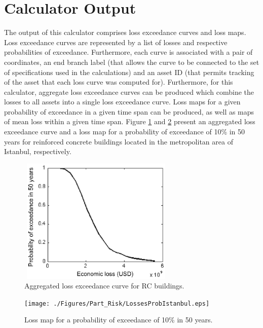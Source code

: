 \section{Calculator Output}
The output of this calculator comprises loss exceedance curves and loss maps. Loss exceedance curves are represented by a list of losses and respective probabilities of exceedance. Furthermore, each curve is associated with a pair of coordinates, an end branch label (that allows the curve to be connected to the set of specifications used in the calculations) and an asset ID (that permits tracking of the asset that each loss curve was computed for). Furthermore, for this calculator, aggregate loss exceedance curves can be produced which combine the losses to all assets into a single loss exceedance curve.  Loss maps for a given probability of exceedance in a given time span can be produced, as well as maps of mean loss within a given time span. Figure \ref{fig:LossCurve} and \ref{fig:ProbLosses} present an aggregated loss exceedance curve and a loss map for a probability of exceedance of 10\% in 50 years for reinforced concrete buildings located in the metropolitan area of Istanbul, respectively. 
\begin{figure}[ht]
\centering
\includegraphics[width=7.5cm,height=6cm]{./Figures/Part_Risk/LossCurveIstanbul.eps} 
\caption{Aggregated loss exceedance curve for RC buildings.}
\label{fig:LossCurve}
\end{figure} 
 \begin{figure}[ht]
\centering
\texttt{[image: ./Figures/Part\_Risk/LossesProbIstanbul.eps]}
\caption{Loss map for a probability of exceedance of 10\% in 50 years.}
\label{fig:ProbLosses}
\end{figure} 

